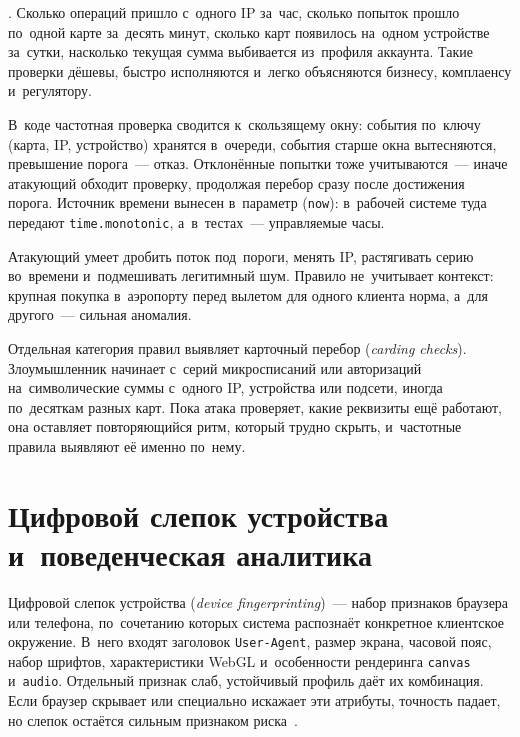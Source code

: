 . Сколько операций пришло с~одного IP за~час, сколько попыток прошло
по~одной карте за~десять минут, сколько карт появилось на~одном устройстве
за~сутки, насколько текущая сумма выбивается из~профиля аккаунта.
Такие проверки дёшевы, быстро исполняются и~легко объясняются бизнесу,
комплаенсу и~регулятору.

В~коде частотная проверка сводится к~скользящему окну: события по~ключу (карта,
IP, устройство) хранятся в~очереди, события старше окна вытесняются, превышение
порога~--- отказ. Отклонённые попытки тоже учитываются~--- иначе атакующий
обходит проверку, продолжая перебор сразу после достижения порога. Источник
времени вынесен в~параметр (\texttt{now}): в~рабочей системе туда передают
\texttt{time.monotonic}, а~в~тестах~--- управляемые часы.

\needspace{0.18\textheight}

Атакующий умеет дробить поток под~пороги, менять IP, растягивать серию
во~времени и~подмешивать легитимный шум. Правило не~учитывает контекст: крупная
покупка в~аэропорту перед вылетом для одного клиента норма, а~для другого~---
сильная аномалия.

Отдельная категория правил выявляет карточный перебор (\textit{carding
checks}). Злоумышленник начинает с~серий микросписаний или авторизаций
на~символические суммы с~одного IP, устройства или подсети, иногда по~десяткам
разных карт. Пока атака проверяет, какие реквизиты ещё работают, она оставляет
повторяющийся ритм, который трудно скрыть, и~частотные правила выявляют её
именно по~нему.

\section{Цифровой слепок устройства и~поведенческая аналитика}\label{sec:fraud-fingerprint}

Цифровой слепок устройства (\textit{device fingerprinting})~--- набор признаков
браузера или телефона, по~сочетанию которых система распознаёт конкретное
клиентское окружение. В~него входят заголовок \texttt{User-Agent}, размер
экрана, часовой пояс, набор шрифтов, характеристики WebGL и~особенности
рендеринга \texttt{canvas} и~\texttt{audio}. Отдельный признак слаб,
устойчивый профиль даёт их комбинация. Если браузер
скрывает или специально искажает эти атрибуты, точность падает, но слепок
остаётся сильным признаком риска~\cite{eckersley-fingerprinting-2010}.

